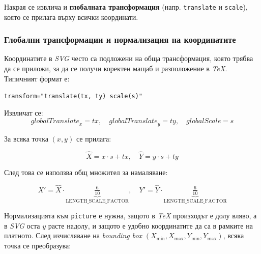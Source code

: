 Накрая се извлича и \textbf{глобалната трансформация} (напр. \texttt{translate} и \texttt{scale}), която се прилага върху всички координати.

\subsubsection{Глобални трансформации и нормализация на координатите}
\hspace*{2.5em}Координатите в \textit{SVG} често са подложени на обща трансформация, която трябва да се приложи, за да се получи коректен мащаб и разположение в \textit{TeX}. Типичният формат е:

\vspace{-0.3cm}

\begin{center}
	\texttt{transform="translate(tx, ty) scale(s)"}
\end{center}

\vspace{-0.2cm}

Извличат се:
\[
\mathit{globalTranslate}_x = tx, \quad
\mathit{globalTranslate}_y = ty, \quad
\mathit{globalScale} = s
\]

\vspace{-0.2cm}

За всяка точка \((x,y)\) се прилага:

\vspace{-0.2cm}

\begin{equation}
	\widehat{X} = x \cdot s + tx, \quad
	\widehat{Y} = y \cdot s + ty
	\label{eq:svg-transform}
\end{equation}

След това се използва общ множител за намаляване:

\begin{equation}
	X' = \widehat{X} \cdot \underbrace{\tfrac{6}{10}}_{\text{LENGTH\_SCALE\_FACTOR}},\quad
	Y' = \widehat{Y} \cdot \underbrace{\tfrac{6}{10}}_{\text{LENGTH\_SCALE\_FACTOR}}
	\label{eq:svg-scale}
\end{equation}

Нормализацията към \texttt{picture} е нужна, защото в \textit{TeX} произходът е долу вляво, а в \textit{SVG} оста \(y\) расте надолу, и защото е удобно координатите да са в рамките на платното. След изчисляване на \textit{bounding box} \((X_{\min},X_{\max},Y_{\min},Y_{\max})\), всяка точка се преобразува:

\vspace{-0.2cm}

